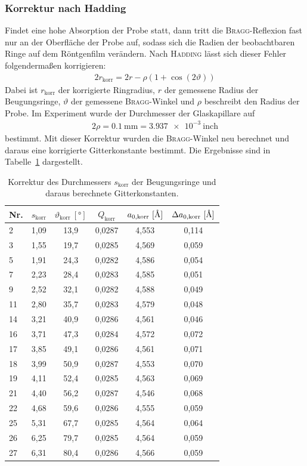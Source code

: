 \documentclass[a4paper,twoside,final]{article}
\begin{document}
\subsubsection{Korrektur nach Hadding}
Findet eine hohe Absorption der Probe statt, dann tritt die \textsc{Bragg}-Reflexion fast nur an der Oberfläche der Probe auf, sodass sich die Radien der beobachtbaren Ringe auf dem Röntgenfilm verändern. Nach \textsc{Hadding} lässt sich dieser Fehler folgendermaßen korrigieren:
\begin{align}
  2r_\text{korr} = 2r - \rho (1+\cos(2\vartheta))
\end{align}
Dabei ist $r_\text{korr}$ der korrigierte Ringradius, $r$ der gemessene Radius der Beugungsringe, $\vartheta$ der gemessene \textsc{Bragg}-Winkel und $\rho$ beschreibt den Radius der Probe. Im Experiment wurde der Durchmesser der Glaskapillare auf
\begin{align}
  2\rho = \SI{0,1}{\milli\metre} = \SI{3,937e-3}{\text{inch}}
\end{align}
bestimmt. Mit dieser Korrektur wurden die \textsc{Bragg}-Winkel neu berechnet und daraus eine korrigierte Gitterkonstante bestimmt. Die Ergebnisse sind in Tabelle~\ref{tab:Hadding} dargestellt.
\begin{table}[ht]
	\centering
	\caption{Korrektur des Durchmessers $s_\text{korr}$ der Beugungsringe und daraus berechnete Gitterkonstanten.}
	\label{tab:Hadding}
	\begin{tabular}{l c c c c c}
		\toprule
      Nr. & $s_\text{korr}$ & $\vartheta_\text{korr}~[\si{\degree}]$ & $Q_\text{korr}$ & $a_{0,\text{korr}}~[\si{\textup{\AA}}]$ & $\Delta a_{0,\text{korr}}~[\si{\textup{\AA}}]$\\
    \midrule
    2  & 1,09 & 13,9 & 0,0287 & 4,553 & 0,114 \\
    3  & 1,55 & 19,7 & 0,0285 & 4,569 & 0,059 \\
    5  & 1,91 & 24,3 & 0,0282 & 4,586 & 0,054 \\
    7  & 2,23 & 28,4 & 0,0283 & 4,585 & 0,051 \\
    9  & 2,52 & 32,1 & 0,0282 & 4,588 & 0,049 \\
    11 & 2,80 & 35,7 & 0,0283 & 4,579 & 0,048 \\
    14 & 3,21 & 40,9 & 0,0286 & 4,561 & 0,046 \\
    16 & 3,71 & 47,3 & 0,0284 & 4,572 & 0,072 \\
    17 & 3,85 & 49,1 & 0,0286 & 4,561 & 0,071 \\
    18 & 3,99 & 50,9 & 0,0287 & 4,553 & 0,070 \\
    19 & 4,11 & 52,4 & 0,0285 & 4,563 & 0,069 \\
    21 & 4,40 & 56,2 & 0,0287 & 4,546 & 0,068 \\
    22 & 4,68 & 59,6 & 0,0286 & 4,555 & 0,059 \\
    25 & 5,31 & 67,7 & 0,0285 & 4,564 & 0,064 \\
    26 & 6,25 & 79,7 & 0,0285 & 4,564 & 0,059 \\
    27 & 6,31 & 80,4 & 0,0286 & 4,566 & 0,059
	\end{tabular}
\end{table}
\FloatBarrier
\end{document}
